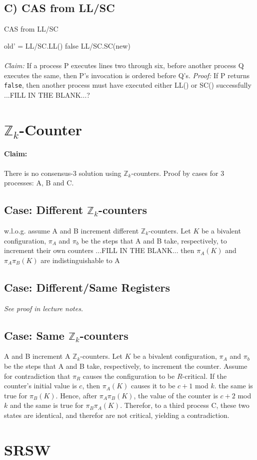 \documentclass[11pt]{article}
\begin{document}
\subsection*{C) CAS from LL/SC} 
\begin{algorithm}
    \caption{CAS from LL/SC}
    \begin{algorithmic}[1]
            \State old' = LL/SC.LL()
                \State \Return false
            \Else
                \State \Return LL/SC.SC(new)
            \EndIf
        \EndFunction
    \end{algorithmic}
\end{algorithm}
\paragraph{} \textit{Claim:} If a process P executes lines two through six, before another process Q executes the same, then P's invocation is ordered before Q's. \textit{Proof:} If P returns \texttt{false}, then another process must have executed either LL() or SC() successfully ...FILL IN THE BLANK...?

\section{$\mathbb{Z}_k$-Counter}
\paragraph{Claim:} There is no consensus-3 solution using $\mathbb{Z}_k$-counters.
Proof by cases for 3 processes: A, B and C.
\subsection{Case: Different $\mathbb{Z}_k$-counters}
    w.l.o.g. assume A and B increment different $\mathbb{Z}_k$-counters. Let $K$ be a bivalent configuration, $\pi_A$ and $\pi_b$ be the steps that A and B take, respectively, to increment their own counters ...FILL IN THE BLANK... then $\pi_A(K)$ and $\pi_A\pi_B(K)$ are indistinguishable to A
\subsection{Case: Different/Same Registers} 
    \textit{See proof in lecture notes.}
\subsection{Case: Same $\mathbb{Z}_k$-counters}
    A and B increment A $\mathbb{Z}_k$-counters. Let $K$ be a bivalent configuration, $\pi_A$ and $\pi_b$ be the steps that A and B take, respectively, to increment the counter. Assume for contradiction that $\pi_R$ causes the configuration to be $R$-critical. If the counter's initial value is $c$, then $\pi_A(K)$ causes it to be $c+1$ mod $k$. the same is true for $\pi_B(K)$. Hence, after $\pi_A\pi_B(K)$, the value of the counter is $c+2$ mod $k$ and the same is true for $\pi_B\pi_A(K)$. Therefor, to a third process C, these two states are identical, and therefor are not critical, yielding a contradiction.

\section{SRSW}
\end{document}
